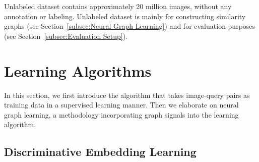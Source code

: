 \documentclass[sigconf]{acmart}
\begin{document}
Unlabeled dataset  contains approximately 20 million images, without any annotation or labeling. Unlabeled dataset is mainly for constructing similarity graphs (see Section~\ref{subsec:Neural Graph Learning}) and for evaluation purposes (see Section~\ref{subsec:Evaluation Setup}).

\begin{comment}
The training system 300 can jointly train the image embedding model 100 and the text embedding model 200 to generate similar embeddings of the search query and the image if the selection data indicates that users frequently select the image when it is identified by a search result for the search query. 
A similarity between embeddings can be determined using any appropriate numerical similarity measure (e.g., a Euclidean distance, if the image embedding model 100 and the text embedding model 200 are configured to generate embeddings of the same dimensionality).
How should we share the data? Especially Navboost \& Coclick signals. (find some references that are publicly available?) (Tom said we should not use the term "click", "coclick")
\end{comment} 
\section{Learning Algorithms}
\label{sec:overview}
In this section, we first introduce the algorithm that takes image-query pairs as training data in a supervised learning manner. Then we elaborate on neural graph learning, a methodology incorporating graph signals into the learning algorithm.

\subsection{Discriminative Embedding Learning}
\label{subsec:Supervised Learning}
\begin{comment}
\begin{itemize}
    \item{softmax classification loss}
    \item{sampled softmax classification loss}
    \item{sampled softmax classification loss + label smoothing}
    \item{classification loss + graph loss}
\end{itemize}
\end{comment}
\end{document}
